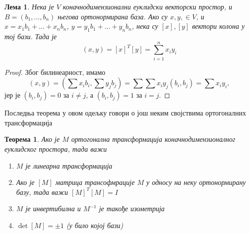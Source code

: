 \documentclass{report}
\theoremstyle{plain}
\newtheorem{thm}{Теорема}
\newtheorem*{lem}{Лема}
\theoremstyle{definition}
\begin{document}
\begin{lem}
  Нека је $V$ коначнодимензионални еуклидски векторски простор, и $B = (b_1, ..., b_n)$ његова ортонормирана база. Ако су $x, y, \in V$, и $x = x_1b_1+...+x_nb_n$, $y = y_1b_1+...+y_nb_n$, нека су $[x], [y]$ вектори колона у тој бази. Тада је $$(x, y) = [x]^T [y] = \sum_{i=1}^{n} x_iy_i$$
\end{lem}
\begin{proof}
    Због билинеарност, имамо 
    $$(x, y) = (\sum x_ib_i, \sum y_j b_j) = \sum \sum x_iy_j(b_i, b_j) = \sum x_iy_i, $$
    јер је $(b_i, b_j) = 0$ за $i\neq j$, а $(b_i, b_j) = 1$ за $i=j$.
\end{proof}

Последња теорема у овом одељку говори о још неким својствима ортогоналних трансформација
\begin{thm}
Ако је $M$ ортогонална трансформација коначнодимензионалног еуклидског простора, тада важи
\begin{enumerate}
  \item $M$ је линеарна трансформација
  \item Ако је $[M]$ матрица трансофмрације $M$ у односу на неку ортонормирану базу, тада важи $[M]^T[M] = I$
  \item $M$ је инвертибилна и $M^{-1}$ је такође изометрија
  \item $\det [M]=\pm 1$ (у било којој бази)
\end{enumerate}
\end{thm}
\end{document}

